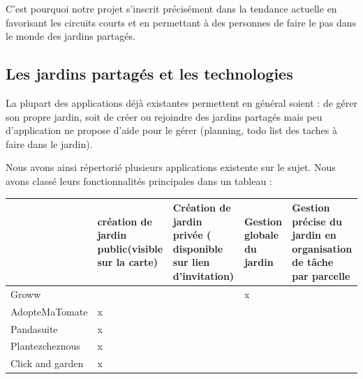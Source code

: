 \documentclass[french,a4paper]{article}
\begin{document}
C’est pourquoi notre projet s’inscrit précisément dans la tendance actuelle en favorisant les circuits courts et en permettant à des personnes de faire le pas dans le monde des jardins partagés.
\subsection{Les jardins partagés et les technologies}
La plupart des applications déjà existantes permettent en général soient : de gérer son propre jardin, soit de créer ou rejoindre des jardins partagés mais peu d’application ne propose d’aide pour le gérer (planning, todo list des taches à faire dans le jardin).

Nous avons ainsi répertorié plusieurs applications existente sur le sujet. Nous avons classé leurs fonctionnalités principales dans un tableau :

\begin{center}
    \begin{tabular}{ |l| p{3cm} | p{3cm} | p{3cm} | p{3cm} | }
        \hline
                         & \raggedright création de jardin public(visible sur la carte) & \raggedright Création de jardin privée ( disponible sur lien d’invitation) & \raggedright Gestion globale du jardin & Gestion précise du jardin en organisation de tâche par parcelle \\
        \hline
        Groww            &                                                              &                                                                            & x                                      &                                                                 \\
        \hline
        AdopteMaTomate   & x                                                            &                                                                            &                                        &                                                                 \\
        \hline
        Pandasuite       & x                                                            &                                                                            &                                        &                                                                 \\
        \hline
        Plantezcheznous  & x                                                            &                                                                            &                                        &                                                                 \\
        \hline
        Click and garden & x                                                            &                                                                            &                                        &                                                                 \\

        \hline
    \end{tabular}
\end{center}
\end{document}
